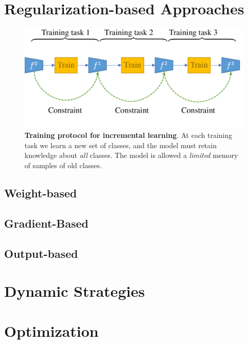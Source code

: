 \section{Regularization-based Approaches}

\begin{figure}[tb]
    \begin{center}
        \includegraphics[width=0.8\linewidth]{images/related/continual_regularizations.pdf}
    \end{center}
    \caption{\textbf{Training protocol for incremental learning}. At each training task we learn a
        new set of classes, and the model must retain knowledge about \textit{all} classes. The
        model is allowed a \textit{limited} memory of samples of old classes.}
    \label{fig:protocol}
\end{figure}

\subsection{Weight-based}

\subsection{Gradient-Based}

\subsection{Output-based}

\section{Dynamic Strategies}



\section{Optimization}

